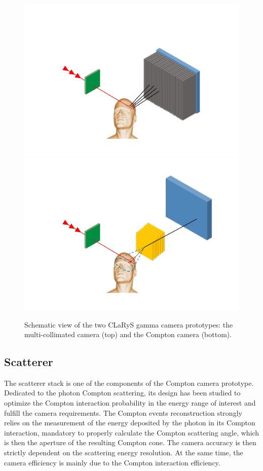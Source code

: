\begin{figure} [!hbtp]
	\centering
	\caption{Schematic view of the two CLaRyS gamma camera prototypes: the multi-collimated camera (top) and the Compton camera (bottom).}
	\label{chap3::fig::camerasScheme}
	\includegraphics[width=1\textwidth]{03_GraphicFiles/chapter3_CLaRySproto/schemes/schema_Collimated_withHodo.pdf}\\
	\includegraphics[width=1\textwidth]{03_GraphicFiles/chapter3_CLaRySproto/schemes/schema_Compton_withHodo.pdf}	
	\end{figure}
 

\subsection{Scatterer}\label{chap3::subsec::scatterer} 
The scatterer stack is one of the components of the Compton camera prototype. Dedicated to the photon Compton scattering, its design has been studied to optimize the Compton interaction probability in the energy range of interest and fulfill the camera requirements. The Compton events reconstruction strongly relies on the measurement of the energy deposited by the photon in its Compton interaction, mandatory to properly calculate the Compton scattering angle, which is then the aperture of the resulting Compton cone. The camera accuracy is then strictly dependent on the scattering energy resolution. At the same time, the camera efficiency is mainly due to the Compton interaction efficiency. 
 

